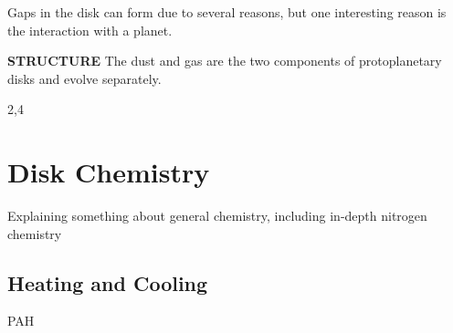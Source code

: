\documentclass[twoside, single, authoryear, semicolon, 12pt]{lion-msc}
\newcommand{\4}{$_4$}
\newcommand{\3}{$_3$}
\newcommand{\2}{$_2$}
\begin{document}
Gaps in the disk can form due to several reasons, but one interesting reason is the interaction with a planet.


\textbf{STRUCTURE}
The dust and gas are the two components of protoplanetary disks and evolve separately. 




2,4






\section{Disk Chemistry}
Explaining something about general chemistry, including in-depth nitrogen chemistry

\subsection{Heating and Cooling}
PAH
\end{document}
